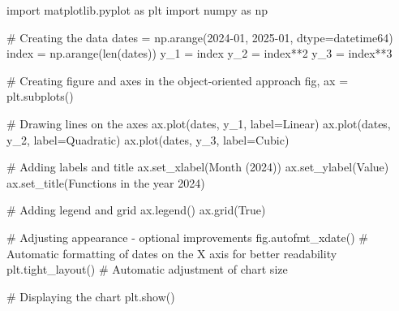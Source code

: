 \documentclass[
  english,
  letterpaper,
  DIV=11,
  numbers=noendperiod]{scrreprt}
\newenvironment{Shaded}{\begin{snugshade}}{\end{snugshade}}
\newcommand{\BuiltInTok}[1]{\textcolor[rgb]{0.00,0.23,0.31}{#1}}
\newcommand{\CommentTok}[1]{\textcolor[rgb]{0.37,0.37,0.37}{#1}}
\newcommand{\DecValTok}[1]{\textcolor[rgb]{0.68,0.00,0.00}{#1}}
\newcommand{\ImportTok}[1]{\textcolor[rgb]{0.00,0.46,0.62}{#1}}
\newcommand{\NormalTok}[1]{\textcolor[rgb]{0.00,0.23,0.31}{#1}}
\newcommand{\OperatorTok}[1]{\textcolor[rgb]{0.37,0.37,0.37}{#1}}
\newcommand{\StringTok}[1]{\textcolor[rgb]{0.13,0.47,0.30}{#1}}
\newcommand{\VariableTok}[1]{\textcolor[rgb]{0.07,0.07,0.07}{#1}}
\begin{document}
\begin{Shaded}
\begin{Highlighting}[]
\ImportTok{import}\NormalTok{ matplotlib.pyplot }\ImportTok{as}\NormalTok{ plt}
\ImportTok{import}\NormalTok{ numpy }\ImportTok{as}\NormalTok{ np}

\CommentTok{\# Creating the data}
\NormalTok{dates }\OperatorTok{=}\NormalTok{ np.arange(}\StringTok{\textquotesingle{}2024{-}01\textquotesingle{}}\NormalTok{, }\StringTok{\textquotesingle{}2025{-}01\textquotesingle{}}\NormalTok{, dtype}\OperatorTok{=}\StringTok{\textquotesingle{}datetime64\textquotesingle{}}\NormalTok{)}
\NormalTok{index }\OperatorTok{=}\NormalTok{ np.arange(}\BuiltInTok{len}\NormalTok{(dates))}
\NormalTok{y\_1 }\OperatorTok{=}\NormalTok{ index}
\NormalTok{y\_2 }\OperatorTok{=}\NormalTok{ index}\OperatorTok{**}\DecValTok{2}
\NormalTok{y\_3 }\OperatorTok{=}\NormalTok{ index}\OperatorTok{**}\DecValTok{3}

\CommentTok{\# Creating figure and axes in the object{-}oriented approach}
\NormalTok{fig, ax }\OperatorTok{=}\NormalTok{ plt.subplots()}

\CommentTok{\# Drawing lines on the axes}
\NormalTok{ax.plot(dates, y\_1, label}\OperatorTok{=}\StringTok{\textquotesingle{}Linear\textquotesingle{}}\NormalTok{)}
\NormalTok{ax.plot(dates, y\_2, label}\OperatorTok{=}\StringTok{\textquotesingle{}Quadratic\textquotesingle{}}\NormalTok{)}
\NormalTok{ax.plot(dates, y\_3, label}\OperatorTok{=}\StringTok{\textquotesingle{}Cubic\textquotesingle{}}\NormalTok{)}

\CommentTok{\# Adding labels and title}
\NormalTok{ax.set\_xlabel(}\StringTok{\textquotesingle{}Month (2024)\textquotesingle{}}\NormalTok{)}
\NormalTok{ax.set\_ylabel(}\StringTok{\textquotesingle{}Value\textquotesingle{}}\NormalTok{)}
\NormalTok{ax.set\_title(}\StringTok{\textquotesingle{}Functions in the year 2024\textquotesingle{}}\NormalTok{)}

\CommentTok{\# Adding legend and grid}
\NormalTok{ax.legend()}
\NormalTok{ax.grid(}\VariableTok{True}\NormalTok{)}

\CommentTok{\# Adjusting appearance {-} optional improvements}
\NormalTok{fig.autofmt\_xdate()  }\CommentTok{\# Automatic formatting of dates on the X axis for better readability}
\NormalTok{plt.tight\_layout()   }\CommentTok{\# Automatic adjustment of chart size}

\CommentTok{\# Displaying the chart}
\NormalTok{plt.show()}
\end{Highlighting}
\end{Shaded}
\end{document}
